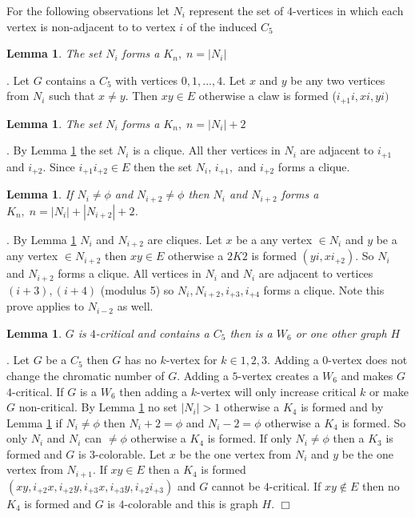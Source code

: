 \documentclass[12pt]{article}
\newtheorem{Lemma}[Theorem]{Lemma}
\begin{document}
For the following observations let $N_i$ represent the set of $4$-vertices in which each vertex is non-adjacent to 
to vertex $i$ of the induced $C_5$
\begin{Lemma}\label{lem:c5-cliques}
The set $N_i$ forms a $K_{n},\; n = |N_i|$
\end{Lemma}
.
Let $G$ contains a $C_5$ with vertices $0, 1,...,4$. Let $x$ and $y$ be any two vertices from $N_i$ such that $x \neq y$. Then $xy \in E$ otherwise a claw is formed ($i_{+1}i,xi,yi)$

\begin{Lemma}\label{lem:c5-pockets}
The set $N_i$ forms a $K_{n},\; n = |N_i| + 2$
\end{Lemma}
.
By Lemma \ref{lem:c5-cliques} the set $N_i$ is a clique. All ther vertices in $N_i$ are adjacent to $i_{+1}$ and $i_{+2}$. Since $i_{+1}i_{+2} \in E$ then the set $N_i$, $i_{+1},$ and $i_{+2}$ forms a clique.

\begin{Lemma}\label{lem:c5-neighbours}
If $N_i \neq \phi$ and $N_{i+2} \neq \phi$ then $N_i$ and $N_{i+2}$ forms a $K_n,\; n = |N_i| + |N_{i+2}| +2 $. 
\end{Lemma}
.
By Lemma \ref{lem:c5-cliques} $N_i$ and $N_{i+2}$ are cliques. Let $x$ be a any vertex $\in N_i$ and $y$ be a any vertex $\in N_{i+2}$ then $xy \in E$ otherwise a $2K2$ is formed $(yi, xi_{+2})$. So $N_i$ and $N_{i+2}$ forms a clique. All vertices in $N_i$ and $N_i$ are adjacent to vertices $(i+3), (i+4)$ (modulus 5) so $N_i, N_{i+2}, i_{+3}, i_{+4}$ forms a clique.
Note this prove applies to $N_{i-2}$ as well.

\begin{Lemma}\label{lem:c5-case}
$G$ is $4$-critical and contains a $C_5$ then is a $W_6$ or one other graph $H$ 
\end{Lemma}
.
Let $G$ be a $C_5$ then $G$ has no $k$-vertex for $k \in {1, 2, 3}$. Adding a $0$-vertex does not change the chromatic number of $G$.
Adding a $5$-vertex creates a $W_6$ and makes $G$ $4$-critical. If $G$ is a $W_6$ then adding a $k$-vertex will only increase critical $k$ or make $G$ non-critical. By Lemma \ref{lem:c5-cliques} no set $|N_i| > 1$ otherwise a $K_4$ is formed and by Lemma \ref{lem:c5-neighbours} if $N_i \neq \phi$ then $N_i+2 = \phi$ and $N_i-2 = \phi$ otherwise a $K_4$ is formed.  So only $N_i$ and $N_i$ can $\neq \phi$ otherwise a $K_4$ is formed. If only $N_i \neq \phi$ then a $K_3$ is formed and $G$ is $3$-colorable. Let $x$ be the one vertex from $N_i$ and  $y$ be the one vertex from $N_{i+1}$. If $xy \in E$ then a $K_4$ is formed $(xy,i_{+2}x,i_{+2}y,i_{+3}x,i_{+3}y,i_{+2}i_{+3})$ and $G$ cannot be $4$-critical. If $xy \not\in E$ then no $K_4$ is formed and $G$ is $4$-colorable and this is graph $H$. $\Box$
\end{document}
